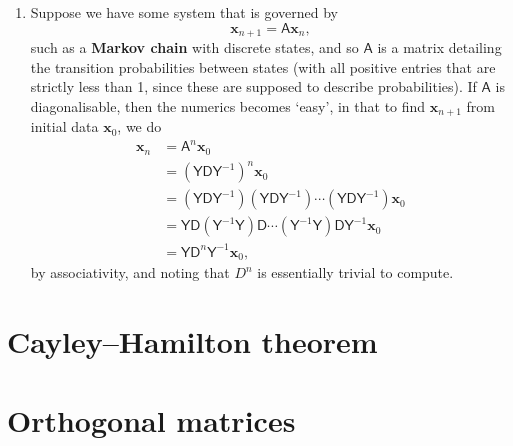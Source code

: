 \documentclass[letter-paper]{tufte-book}
\newenvironment{example}[1][Example]{\begin{trivlist}
\item[\hskip \labelsep {\bfseries #1}]}{\end{trivlist}}
\begin{document}
\begin{example}
\begin{enumerate}
    \item Suppose we have some system that is governed by
    \begin{equation*}
      \boldsymbol{x}_{n+1} = \mathsf{A}\boldsymbol{x}_n,
    \end{equation*}
    such as a \textbf{Markov chain} with discrete states, and so $\mathsf{A}$ is
    a matrix detailing the transition probabilities between states (with all
    positive entries that are strictly less than 1, since these are supposed to
    describe probabilities). If $\mathsf{A}$ is diagonalisable, then the
    numerics becomes `easy', in that to find $\boldsymbol{x}_{n+1}$ from initial
    data $\boldsymbol{x}_0$, we do
    \begin{align*}
      \boldsymbol{x}_n &= \mathsf{A}^n\boldsymbol{x}_0 \\ 
        &= (\mathsf{YD}\mathsf{Y}^{-1})^n \boldsymbol{x}_0 \\
        &= (\mathsf{YD}\mathsf{Y}^{-1})(\mathsf{YD}\mathsf{Y}^{-1})\cdots(\mathsf{YD}\mathsf{Y}^{-1}) \boldsymbol{x}_0 \\
        &= \mathsf{YD}(\mathsf{Y}^{-1}\mathsf{Y})\mathsf{D}\cdots(\mathsf{Y}^{-1}\mathsf{Y})\mathsf{D}\mathsf{Y}^{-1} \boldsymbol{x}_0 \\
        &= \mathsf{YD}^n\mathsf{Y}^{-1} \boldsymbol{x}_0,
    \end{align*}
    by associativity, and noting that $D^n$ is essentially trivial to
    compute.
  \end{enumerate}
\end{example}


\section{Cayley--Hamilton theorem}


\section{Orthogonal matrices}
\end{document}
